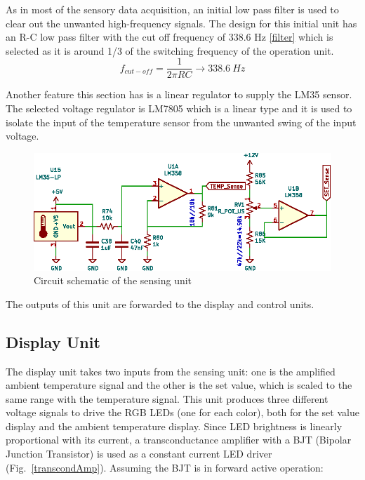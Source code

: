 \documentclass[conference]{IEEEtran}
\begin{document}
As in most of the sensory data acquisition, an initial low pass filter is used to clear out the unwanted high-frequency signals\cite{b1}. The design for this initial unit has an R-C low pass filter with the cut off frequency of 338.6 Hz \eqref{filter} which is selected as it is around 1/3 of the switching frequency of the operation unit. 
\begin{equation*}
f_{cut-off} =\frac{1}{2\pi RC} \rightarrow 338.6\ Hz \label{filter}
\end{equation*}

Another feature this section has is a linear regulator to supply the LM35 sensor. The selected voltage regulator is LM7805 which is a linear type and it is used to isolate the input of the temperature sensor from the unwanted swing of the input voltage.

\begin{figure}[h]
\centerline{\includegraphics[scale=0.75]{figures/sense-sch.eps}}
\caption{Circuit schematic of the sensing unit}
\label{fig}
\end{figure}

The outputs of this unit are forwarded to the display and control units.

\subsection{Display Unit}

The display unit takes two inputs from the sensing unit: one is the amplified ambient temperature signal and the other is the set value, which is scaled to the same range with the temperature signal. This unit produces three different voltage signals to drive the RGB LEDs (one for each color), both for the set value display and the ambient temperature display. Since LED brightness is linearly proportional with its current, a transconductance amplifier with a BJT (Bipolar Junction Transistor) is used as a constant current LED driver (Fig.~\ref{transcondAmp}). Assuming the BJT is in forward active operation:
\end{document}
